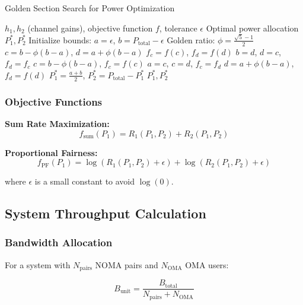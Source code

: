 \documentclass[11pt,a4paper]{article}
\begin{document}
\begin{algorithm}[H]
\caption{Golden Section Search for Power Optimization}
\begin{algorithmic}[1]
\REQUIRE $h_1, h_2$ (channel gains), objective function $f$, tolerance $\epsilon$
\ENSURE Optimal power allocation $P_1^*, P_2^*$
\STATE Initialize bounds: $a = \epsilon$, $b = P_{\text{total}} - \epsilon$
\STATE Golden ratio: $\phi = \frac{\sqrt{5} - 1}{2}$
\STATE $c = b - \phi(b - a)$, $d = a + \phi(b - a)$
\STATE $f_c = f(c)$, $f_d = f(d)$
        \STATE $b = d$, $d = c$, $f_d = f_c$
        \STATE $c = b - \phi(b - a)$, $f_c = f(c)$
    \ELSE
        \STATE $a = c$, $c = d$, $f_c = f_d$
        \STATE $d = a + \phi(b - a)$, $f_d = f(d)$
    \ENDIF
\ENDWHILE
\STATE $P_1^* = \frac{a + b}{2}$, $P_2^* = P_{\text{total}} - P_1^*$
\RETURN $P_1^*, P_2^*$
\end{algorithmic}
\end{algorithm}

\subsubsection{Objective Functions}

\textbf{Sum Rate Maximization:}
\begin{equation}
f_{\text{sum}}(P_1) = R_1(P_1, P_2) + R_2(P_1, P_2)
\end{equation}

\textbf{Proportional Fairness:}
\begin{equation}
f_{\text{PF}}(P_1) = \log(R_1(P_1, P_2) + \epsilon) + \log(R_2(P_1, P_2) + \epsilon)
\end{equation}

where $\epsilon$ is a small constant to avoid $\log(0)$.

\subsection{System Throughput Calculation}

\subsubsection{Bandwidth Allocation}

For a system with $N_{\text{pairs}}$ NOMA pairs and $N_{\text{OMA}}$ OMA users:

\begin{equation}
B_{\text{unit}} = \frac{B_{\text{total}}}{N_{\text{pairs}} + N_{\text{OMA}}}
\end{equation}
\end{document}
